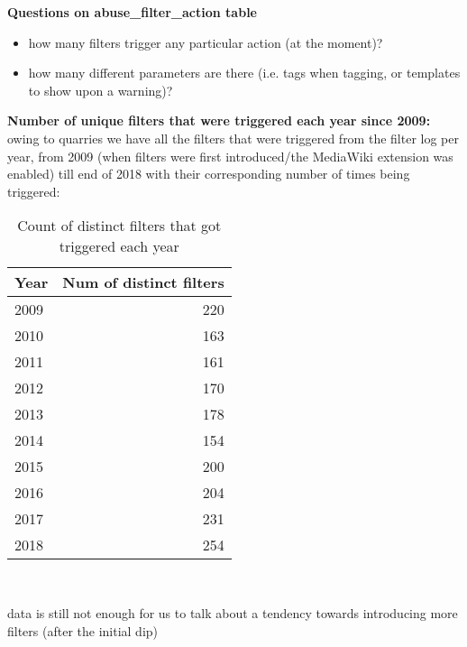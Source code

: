 \textbf{Questions on abuse\_filter\_action table}
\begin{itemize}
    \item how many filters trigger any particular action (at the moment)?
    \item how many different parameters are there (i.e. tags when tagging, or templates to show upon a warning)?
\end{itemize}

\textbf{Number of unique filters that were triggered each year since 2009:}
owing to quarries we have all the filters that were triggered from the filter log per year, from 2009 (when filters were first introduced/the MediaWiki extension was enabled) till end of 2018 with their corresponding number of times being triggered:
\begin{table}
  \centering
  \begin{tabular}{l r }
    Year & Num of distinct filters \\
    \hline
    2009 & 220 \\
    2010 & 163 \\
    2011 & 161 \\
    2012 & 170 \\
    2013 & 178 \\
    2014 & 154 \\
    2015 & 200 \\
    2016 & 204 \\
    2017 & 231 \\
    2018 & 254 \\
  \end{tabular}
  \caption{Count of distinct filters that got triggered each year}~\label{tab:active-filters-count}
\end{table}

data is still not enough for us to talk about a tendency towards introducing more filters (after the initial dip)

\begin{comment}
\url{https://en.wikipedia.org/wiki/Wikipedia:Edit_filter/Requested}
"Each filter takes time to run, making editing (and to some extent other things) slightly slower. The time is only a few milliseconds per filter, but with enough filters that adds up. When the system is near its limit, adding a new filter may require removing another filter in order to keep the system within its limits."
\end{comment}

